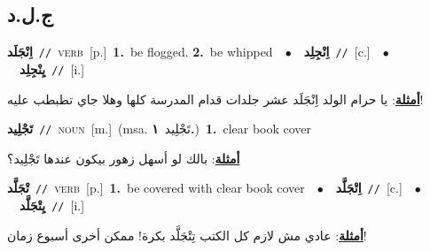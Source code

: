 \documentclass[10pt,a4paper,twoside]{article} %
\begin{document}
\begin{multicols}{2}
\vspace{-3mm}
\subsection*{\color{blue}\foreignlanguage{arabic}{ج.ل.د}\color{blue}{}} 

{\setlength\topsep{0pt}\textbf{\foreignlanguage{arabic}{اِنْجَلَد}}\ {\color{gray}\texttt{//}\color{black}}\ \textsc{verb}\ [p.]\ \textbf{1.}~be flogged.  \textbf{2.}~be whipped\ \ $\bullet$\ \ \setlength\topsep{0pt}\textbf{\foreignlanguage{arabic}{اِنْجِلِد}}\ {\color{gray}\texttt{//}\color{black}}\ [c.]\ \ $\bullet$\ \ \setlength\topsep{0pt}\textbf{\foreignlanguage{arabic}{يِنْجِلِد}}\ {\color{gray}\texttt{//}\color{black}}\ [i.]\  \begin{flushright}\color{gray}\foreignlanguage{arabic}{\textbf{\underline{\foreignlanguage{arabic}{أمثلة}}}: يا حرام الولد اِنْجَلَد عشر جلدات قدام المدرسة كلها وهلا جاي تطبطب عليه!}\end{flushright}\color{black}} \vspace{2mm}

{\setlength\topsep{0pt}\textbf{\foreignlanguage{arabic}{تَجْلِيد}}\ {\color{gray}\texttt{//}\color{black}}\ \textsc{noun}\ [m.]\ \color{gray}(msa. \foreignlanguage{arabic}{تَجْلِيد}~\foreignlanguage{arabic}{\textbf{١.}})\color{black}\ \textbf{1.}~clear book cover\  \begin{flushright}\color{gray}\foreignlanguage{arabic}{\textbf{\underline{\foreignlanguage{arabic}{أمثلة}}}: بالك لو أسهل زهور بيكون عندها تَجْلِيد؟}\end{flushright}\color{black}} \vspace{2mm}

{\setlength\topsep{0pt}\textbf{\foreignlanguage{arabic}{تْجَلَّد}}\ {\color{gray}\texttt{//}\color{black}}\ \textsc{verb}\ [p.]\ \textbf{1.}~be covered with clear book cover\ \ $\bullet$\ \ \setlength\topsep{0pt}\textbf{\foreignlanguage{arabic}{اِتْجَلَّد}}\ {\color{gray}\texttt{//}\color{black}}\ [c.]\ \ $\bullet$\ \ \setlength\topsep{0pt}\textbf{\foreignlanguage{arabic}{يِتْجَلَّد}}\ {\color{gray}\texttt{//}\color{black}}\ [i.]\  \begin{flushright}\color{gray}\foreignlanguage{arabic}{\textbf{\underline{\foreignlanguage{arabic}{أمثلة}}}: عادي مش لازم كل الكتب تِتْجَلَّد بكرة! ممكن أخرى أسبوع زمان!}\end{flushright}\color{black}} \vspace{2mm}


\end{multicols}
\end{document}
